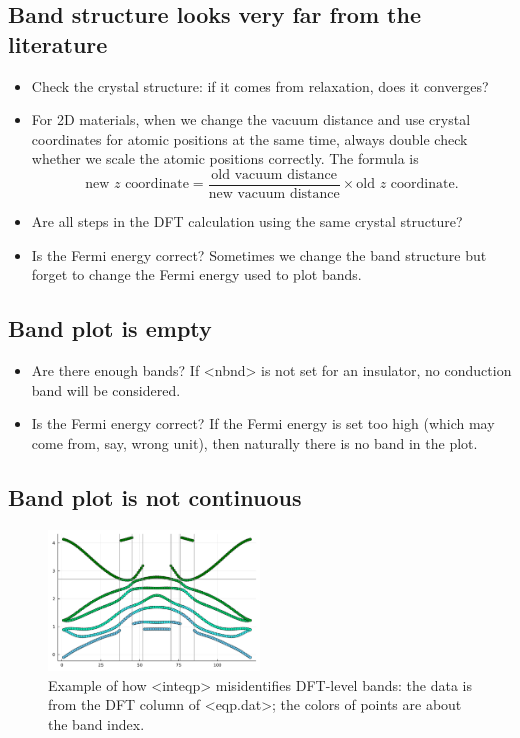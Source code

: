 \documentclass[hyperref, a4paper, 12pt]{report}
\def\texttt#1{<#1>}%
\newcommand{\shortcode}[1]{\texttt{#1}}
\begin{document}
\subsection{Band structure looks very far from the literature}

\begin{itemize}
    \item Check the crystal structure: if it comes from relaxation,
    does it converges?
    \item For 2D materials, 
    when we change the vacuum distance
    and use crystal coordinates for atomic positions at the same time, 
    always double check whether we scale the atomic positions correctly.
    The formula is 
    \begin{equation}
        \text{new $z$ coordinate} = \frac{\text{old vacuum distance}}{\text{new vacuum distance}} \times \text{old $z$ coordinate}.
    \end{equation}
    \item Are all steps in the DFT calculation using the same crystal structure?
    \item Is the Fermi energy correct? 
    Sometimes we change the band structure but forget to change the Fermi energy used to plot bands.
\end{itemize}

\subsection{Band plot is empty}

\begin{itemize}
    \item Are there enough bands? 
    If \shortcode{nbnd} is not set for an insulator,
    no conduction band will be considered.
    \item Is the Fermi energy correct? If the Fermi energy is set too high 
    (which may come from, say, wrong unit), 
    then naturally there is no band in the plot.
\end{itemize}

\subsection{Band plot is not continuous}\label{sec:discontinuous-band}

\begin{figure}
    \centering
    \includegraphics[width=0.5\textwidth]{plots/dft-level-bands.pdf}
    \caption{Example of how \shortcode{inteqp} misidentifies DFT-level bands:
    the data is from the DFT column of \shortcode{eqp.dat};
    the colors of points are about the band index.}
    \label{fig:inteqp-shuffle-band-index-1}
\end{figure}
\end{document}
